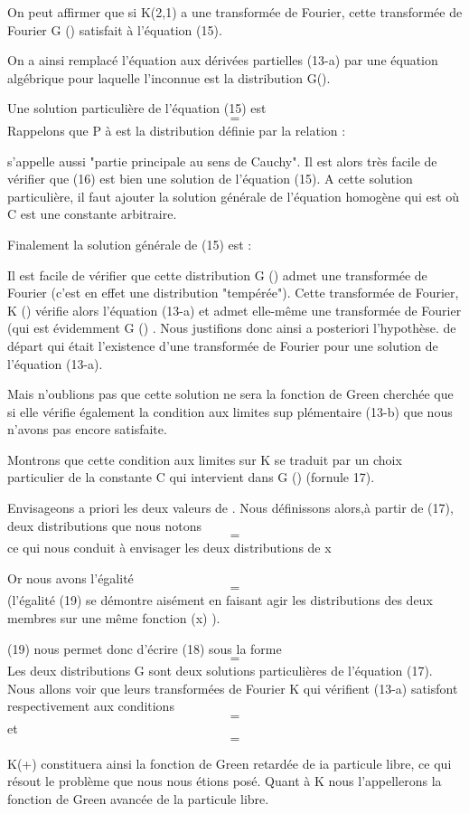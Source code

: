 On peut affirmer que si K(2,1) a une transformée de Fourier,
cette transformée de Fourier G () satisfait à l'équation (15).

On a ainsi remplacé l'équation aux dérivées partielles (13-a)
par une équation algébrique pour laquelle l'inconnue est la distribution
G().

Une solution particulière de l'équation (15) est
\[
\tag{16}=
\]
Rappelons que P à est la distribution définie par la relation :

 s'appelle aussi "partie principale au sens de Cauchy".
Il est alors très facile de vérifier que (16) est bien une solution de
l'équation (15). A cette solution particulière, il faut ajouter la solution
générale de l'équation homogène
qui est  où C est une constante arbitraire.

Finalement la solution générale de (15) est :

Il est facile de vérifier que cette distribution G () admet une
transformée de Fourier (c'est en effet une distribution "tempérée").
Cette transformée de Fourier, K () vérifie alors l'équation
(13-a) et admet elle-même une transformée de Fourier (qui est évidemment
G () . Nous justifions donc ainsi a posteriori l'hypothèse. de départ
qui était l'existence d'une transformée de Fourier pour une solution de
l'équation (13-a).

Mais n'oublions pas que cette solution ne sera la fonction de
Green cherchée que si elle vérifie également la condition aux limites sup
plémentaire (13-b) que nous n'avons pas encore satisfaite.

Montrons que cette condition aux limites sur K se traduit par
un choix particulier de la constante C qui intervient dans G ()
(fornule 17).

Envisageons a priori les deux valeurs de .
Nous définissons alors,à partir de (17), deux distributions que nous notons
\[
\tag{18}=
\]
ce qui nous conduit à envisager les deux distributions de x

Or nous avons l'égalité
\[
\tag{1}=
\]
(l'égalité (19) se démontre aisément en faisant agir les distributions des
deux membres sur une même fonction  (x) ).

(19) nous permet donc d'écrire (18) sous la forme
\[
\tag{20}=
\]
Les deux distributions G sont deux solutions particulières de l'équation
(17). Nous allons voir que leurs transformées de Fourier K
qui vérifient (13-a) satisfont respectivement aux conditions
\[
\tag{21-a}=
\]
et
\[
\tag{21-b}=
\]

K(+) constituera ainsi la fonction de Green retardée de ia
particule libre, ce qui résout le problème que nous nous étions posé.
Quant à K nous l'appellerons la fonction de Green avancée de la
particule libre.

